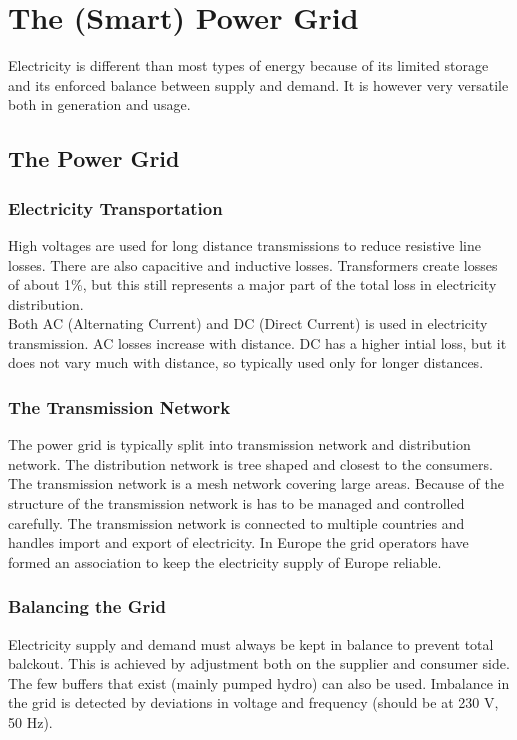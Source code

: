 \section{The (Smart) Power Grid}
Electricity is different than most types of energy because of its limited storage and its enforced balance between supply and demand. It is however very versatile both in generation and usage.

\subsection{The Power Grid}

\subsubsection{Electricity Transportation}
High voltages are used for long distance transmissions to reduce resistive line losses. There are also capacitive and inductive losses.
Transformers create losses of about 1\%, but this still represents a major part of the total loss in electricity distribution.\\

Both AC (Alternating Current) and DC (Direct Current) is used in electricity transmission.
AC losses increase with distance.
DC has a higher intial loss, but it does not vary much with distance, so typically used only for longer distances.

\subsubsection{The Transmission Network}
The power grid is typically split into transmission network and distribution network.
The distribution network is tree shaped and closest to the consumers.
The transmission network is a mesh network covering large areas.
Because of the structure of the transmission network is has to be managed and controlled carefully.
The transmission network is connected to multiple countries and handles import and export of electricity. In Europe the grid operators have formed an association to keep the electricity supply of Europe reliable.

\subsubsection{Balancing the Grid}
Electricity supply and demand must always be kept in balance to prevent total balckout.
This is achieved by adjustment both on the supplier and consumer side.
The few buffers that exist (mainly pumped hydro) can also be used. Imbalance in the grid is detected by deviations in voltage and frequency (should be at 230 V, 50 Hz).\\

